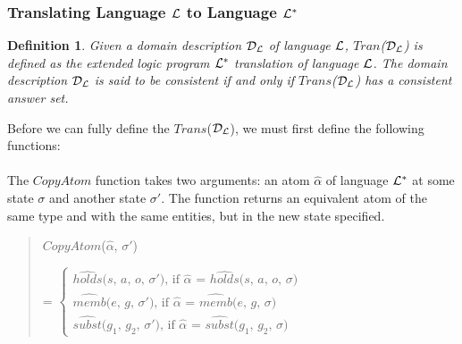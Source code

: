 \documentclass[10pt, twocolumn]{article}
\newtheorem{definition}{Definition}
\begin{document}
      \subsubsection{Translating Language ${\cal L}$ to Language ${\cal L^{*}}$}

        \begin{definition}
          Given a domain description ${\cal D}_{\cal L}$ of language
          ${\cal L}$, $Tran$(${\cal D}_{\cal L}$) is defined as the
          extended logic program ${\cal L}^{*}$ translation of language
          ${\cal L}$. The domain description ${\cal D}_{\cal L}$ is said to be
          {\em consistent} if and only if $Trans$(${\cal D}_{\cal L}$) has
          a consistent answer set.
        \end{definition}

        Before we can fully define the $Trans$(${\cal D}_{\cal L}$), we must
        first define the following functions:

        \paragraph{}

          The $CopyAtom$ function takes two arguments: an atom $\hat{\alpha}$
          of language ${\cal L}^{*}$ at some state $\sigma$ and another state
          $\sigma'$. The function returns an equivalent atom of the same type
          and with the same entities, but in the new state specified.

          \begin{quote}
            $CopyAtom$($\hat{\alpha}$, $\sigma'$)

            =
            \begin{math}
              \begin{cases}
                \mbox{$\hat{holds}$($s$, $a$, $o$, $\sigma'$), if $\hat{\alpha}$ = $\hat{holds}$($s$, $a$, $o$, $\sigma$)} \\
                \mbox{$\hat{memb}$($e$, $g$, $\sigma'$), if $\hat{\alpha}$ = $\hat{memb}$($e$, $g$, $\sigma$)} \\
                \mbox{$\hat{subst}$($g_{1}$, $g_{2}$, $\sigma'$), if $\hat{\alpha}$ = $\hat{subst}$($g_{1}$, $g_{2}$, $\sigma$)}
              \end{cases}
            \end{math}
          \end{quote}

        \paragraph{}
\end{document}
